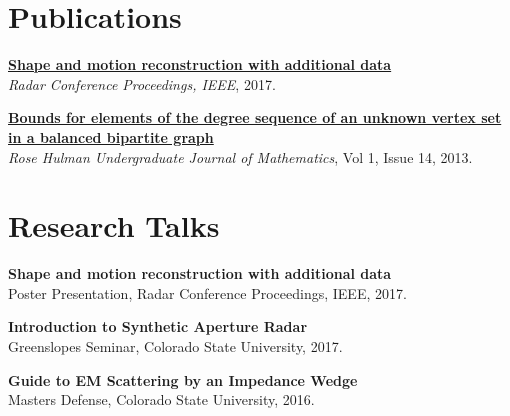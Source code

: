 \documentclass[letterpaper]{pine-resume} %
\begin{document}
\begin{minipage}[t]{0.65\textwidth} %


\section{Publications}

\href{http://ieeexplore.ieee.org/document/7944424/}{\textbf{Shape and motion reconstruction with additional data}} \\
\emph{Radar Conference Proceedings, IEEE}, 2017.
\vspace{.2 cm}

\href{https://www.rose-hulman.edu/mathjournal/archives/2013/vol14-n1/paper11/v14n1-11pd.pdf}{\textbf{Bounds for elements of the degree sequence of an unknown vertex set in a balanced bipartite graph}} \\
\emph{Rose Hulman Undergraduate Journal of Mathematics}, Vol 1, Issue 14, 2013.

\sectionspace %


\section{Research Talks}

\textbf{Shape and motion reconstruction with additional data} \\
Poster Presentation, Radar Conference Proceedings, IEEE, 2017.
\vspace{.2 cm}

\textbf{Introduction to Synthetic Aperture Radar} \\
Greenslopes Seminar, Colorado State University, 2017.
\vspace{.2 cm}

\textbf{Guide to EM Scattering by an Impedance Wedge}\\
Masters Defense, Colorado State University, 2016.

\sectionspace %



\end{minipage}
\end{document}
